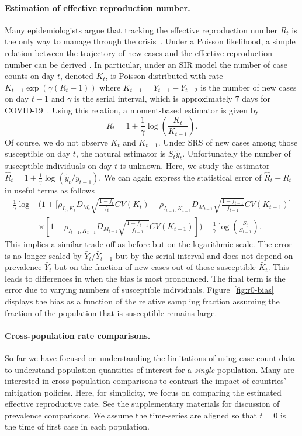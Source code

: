 \documentclass[12pt]{article}
\begin{document}
\paragraph*{Estimation of effective reproduction number.}
Many epidemiologists argue that tracking the effective reproduction number $R_t$ is the only way to manage through the crisis~\cite{Gabriel2020}.  Under a Poisson likelihood, a simple relation between the trajectory of new cases and the effective reproduction number can be derived \cite{Bettencourt2008}.  In particular, under an SIR model the number of case counts on day $t$, denoted $K_t$, is Poisson distributed with rate $K_{t-1} \exp \left( \gamma (R_t - 1) \right)$ where $K_{t-1} = Y_{t-1}-Y_{t-2}$ is the number of new cases on day $t-1$ and $\gamma$ is the serial interval, which is approximately $7$ days for COVID-19~\cite{Sanche2020}.  Using this relation, a moment-based estimator is given by
$$
R_t = 1 + \frac{1}{\gamma} \log \left( \frac{K_t}{K_{t-1}} \right).
$$
Of course, we do not observe $K_t$ and $K_{t-1}$.  Under SRS of new cases among those susceptible on day $t$, the natural estimator is $S_t \tilde y_t$.  Unfortunately the number of susceptible individuals on day $t$ is unknown.  Here, we study the estimator $\hat R_t = 1 + \frac{1}{\gamma} \log \left( \tilde y_t / \tilde y_{t-1} \right)$. We can again express the statistical error of $\hat R_t - R_t$ in useful terms as follows
$$
\begin{aligned}
\frac{1}{\gamma}\log &\bigg( 1 + \bigg[ \rho_{I_t,K_t} D_{M_t} \sqrt{\frac{1-f_t}{f_t}} CV (K_t)  -\rho_{I_{t-1},K_{t-1}} D_{M_{t-1}} \sqrt{\frac{1-f_{t-1}}{f_{t-1}}} CV (K_{t-1}) \bigg] \\
&\times \left[ 1 - \rho_{I_{t-1},K_{t-1}} D_{M_{t-1}} \sqrt{\frac{1-f_{t-1}}{f_{t-1}}} CV (K_{t-1}) \right] \bigg) - \frac{1}{\gamma} \log \left( \frac{S_t}{S_{t-1}} \right).
\end{aligned}
$$
This implies a similar trade-off as before but on the logarithmic scale.  The error is no longer scaled by $\bar Y_t/\bar Y_{t-1}$ but by the serial interval and does not depend on prevalence $\bar Y_t$ but on the fraction of new cases out of those susceptible $\bar K_t$. This leads to differences in when the bias is most pronounced. The final term is the error due to varying numbers of susceptible individuals.  Figure~\ref{fig:r0-bias} displays the bias as a function of the relative sampling fraction assuming the fraction of the population that is susceptible remains large.

\paragraph*{Cross-population rate comparisons.}
So far we have focused on understanding the limitations of using case-count data to understand population quantities of interest for a \emph{single} population.  Many are interested in cross-population comparisons to contrast the impact of countries' mitigation policies.  Here, for simplicity, we focus on comparing the estimated effective reproductive rate. See the supplementary materials for discussion of prevalence comparisons.  We assume the time-series are aligned so that $t=0$ is the time of first case in each population.
\end{document}
